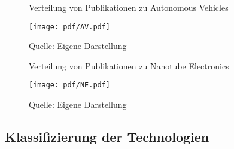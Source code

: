 \begin{figure}
	\centering
	\caption{Verteilung von Publikationen zu \glqq Autonomous Vehicles\grqq}
	\texttt{[image: pdf/AV.pdf]}
	\caption*{Quelle: Eigene Darstellung}
	\label{fig:av_pub}
\end{figure}

\begin{figure}
	\centering
	\caption{Verteilung von Publikationen zu \glqq Nanotube Electronics\grqq}
	\texttt{[image: pdf/NE.pdf]}
	\caption*{Quelle: Eigene Darstellung}
	\label{fig:ne_pub}
\end{figure}

\subsection{Klassifizierung der Technologien}


